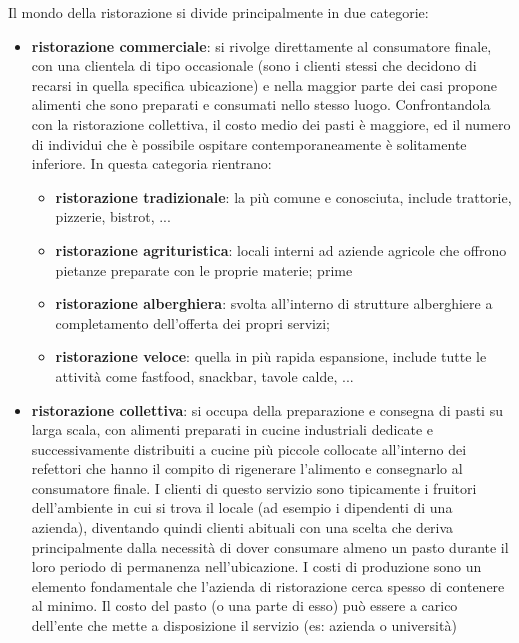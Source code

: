\documentclass[a4paper, titlepage, 12pt, openright, twoside]{book}
\begin{document}
Il mondo della ristorazione si divide principalmente in due categorie:
\begin{itemize}
	\item \textbf{ristorazione commerciale}: si rivolge direttamente al consumatore finale, con una clientela di tipo occasionale
											 (sono i clienti stessi che decidono di recarsi in quella specifica ubicazione) e nella maggior parte dei casi
											 propone alimenti che sono preparati e consumati nello stesso luogo. Confrontandola con la ristorazione collettiva,
											 il costo medio dei pasti è maggiore, ed il numero di individui che è possibile ospitare contemporaneamente è solitamente inferiore.
											 In questa categoria rientrano:
											 \begin{itemize}
											 	\item \textbf{ristorazione tradizionale}: la più comune e conosciuta, include trattorie, pizzerie, bistrot, ...
											 	\item \textbf{ristorazione agrituristica}: locali interni ad aziende agricole che offrono pietanze preparate con le proprie materie; prime
											 	\item \textbf{ristorazione alberghiera}: svolta all'interno di strutture alberghiere a completamento dell'offerta dei propri servizi;
											 	\item \textbf{ristorazione veloce}: quella in più rapida espansione, include tutte le attività 
											 										come fastfood, snackbar, tavole calde, ...
											 \end{itemize}
	\item \textbf{ristorazione collettiva}: si occupa della preparazione e consegna di pasti su larga scala, con alimenti preparati in cucine industriali dedicate e
											successivamente distribuiti a cucine più piccole collocate all'interno dei refettori che hanno il compito di rigenerare l'alimento
											e consegnarlo al consumatore finale. I clienti di questo servizio sono tipicamente i fruitori dell'ambiente in cui si trova il locale
											(ad esempio i dipendenti di una azienda), diventando quindi clienti abituali con una scelta che deriva principalmente 
											dalla necessità di dover consumare almeno un pasto durante il loro periodo di permanenza nell'ubicazione. 
											I costi di produzione sono un elemento fondamentale che l'azienda di ristorazione cerca spesso di contenere al minimo.
											Il costo del pasto (o una parte di esso) può essere a carico dell'ente che mette a disposizione il servizio (es: azienda o università)

\end{itemize}
\end{document}
